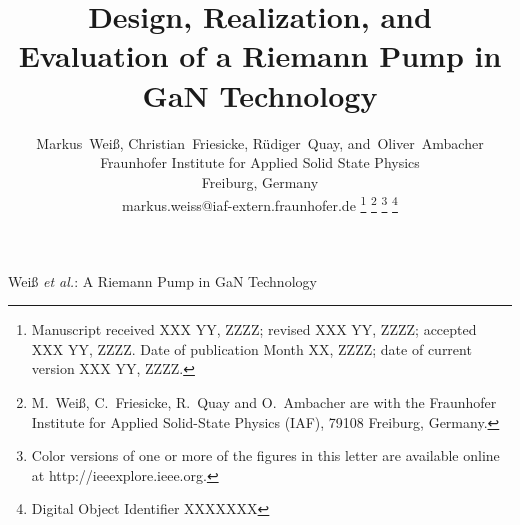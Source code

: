 \documentclass[journal]{IEEEtran}
\begin{document}
\title{Design, Realization, and Evaluation of a Riemann Pump in GaN Technology}
\author{%
	Markus~Wei\ss{},
    Christian~Friesicke,
    R\"{u}diger~Quay,
    and~Oliver~Ambacher\\
    Fraunhofer Institute for Applied Solid State Physics\\
    Freiburg, Germany\\
    markus.weiss@iaf-extern.fraunhofer.de%
    \thanks{%
      Manuscript received XXX YY, ZZZZ;
      revised XXX YY, ZZZZ;
      accepted XXX YY, ZZZZ.
      Date of publication Month XX, ZZZZ;
      date of current version XXX YY, ZZZZ.      
    }%
    \thanks{M.~Wei\ss{}, C.~Friesicke, R.~Quay and O.~Ambacher are with the Fraunhofer Institute for Applied Solid-State
      Physics (IAF), 79108 Freiburg, Germany.%
    }%
    \thanks{%
      Color versions of one or more of the figures in this letter are available
      online at http://ieeexplore.ieee.org.}
    \thanks{%
      Digital Object Identifier XXXXXXX%
    }%
}

%
         {Wei\ss{} \MakeLowercase{\textit{et al.}}:
          A Riemann Pump in GaN Technology}
\maketitle


\end{document}

